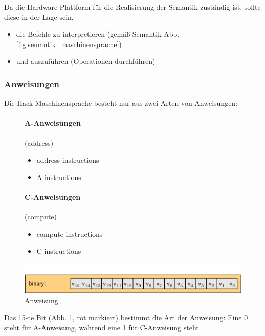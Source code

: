 \documentclass[12pt]{report}
\begin{document}
Da die Hardware-Plattform für die Realisierung der Semantik zuständig ist, sollte diese in der Lage sein,
\begin{itemize}
  \item die Befehle zu interpretieren (gemäß Semantik Abb. \ref{fig:semantik_maschinensprache})
  \item und auszuführen (Operationen durchführen)
\end{itemize}


\subsubsection{Anweisungen}
Die Hack-Maschinensprache besteht nur aus zwei Arten von Anweisungen:
\begin{figure}[H]
  \begin{minipage}[t]{0.45\textwidth}
    \paragraph{A-Anweisungen} (address)
    \begin{itemize}
      \item address instructions
      \item A instructions
    \end{itemize}
  \end{minipage}
  \hfill
  \begin{minipage}[t]{0.45\textwidth}
    \paragraph{C-Anweisungen} (compute)
    \begin{itemize}
      \item compute instructions
      \item C instructions
    \end{itemize}
  \end{minipage}
\end{figure}

\begin{figure}[H]
  \caption{Anweisung}
  \label{fig:maschinensprache_anweisung}
  \centering
  \includegraphics{maschinensprache_anweisung}
\end{figure}

Das 15-te Bit (Abb. \ref{fig:maschinensprache_anweisung}, rot markiert) bestimmt die Art der Anweisung:
Eine 0 steht für A-Anweisung, während eine 1 für C-Anweisung steht.
\end{document}
